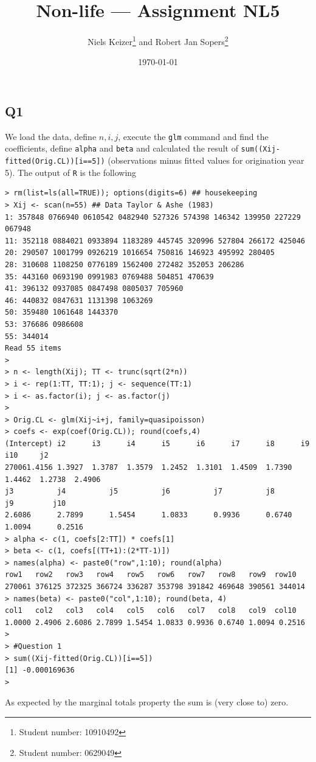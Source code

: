 \documentclass[11pt]{article}
\title{Non-life --- Assignment NL5}  %
\author{
  Niels Keizer\footnote{Student number: 10910492}
  \quad and \quad
  Robert Jan Sopers\footnote{Student number: 0629049}
}
\date{\today}
\begin{document}
\maketitle

\subsection*{Q1}

We load the data, define $n,i,j$, execute the \verb|glm| command and find the coefficients, define \verb|alpha| and \verb|beta| and calculated the result of \verb|sum((Xij-fitted(Orig.CL))[i==5])| (observations minus fitted values for origination year 5). The output of \verb|R| is the following

\begin{verbatim}
> rm(list=ls(all=TRUE)); options(digits=6) ## housekeeping
> Xij <- scan(n=55) ## Data Taylor & Ashe (1983)
1: 357848 0766940 0610542 0482940 527326 574398 146342 139950 227229 067948
11: 352118 0884021 0933894 1183289 445745 320996 527804 266172 425046
20: 290507 1001799 0926219 1016654 750816 146923 495992 280405
28: 310608 1108250 0776189 1562400 272482 352053 206286
35: 443160 0693190 0991983 0769488 504851 470639
41: 396132 0937085 0847498 0805037 705960
46: 440832 0847631 1131398 1063269
50: 359480 1061648 1443370
53: 376686 0986608
55: 344014
Read 55 items
> 
> n <- length(Xij); TT <- trunc(sqrt(2*n))
> i <- rep(1:TT, TT:1); j <- sequence(TT:1)
> i <- as.factor(i); j <- as.factor(j)
> 
> Orig.CL <- glm(Xij~i+j, family=quasipoisson)
> coefs <- exp(coef(Orig.CL)); round(coefs,4)
(Intercept)	i2      i3      i4      i5      i6      i7      i8      i9      i10     j2 
270061.4156 1.3927  1.3787  1.3579  1.2452  1.3101  1.4509  1.7390  1.4462  1.2738  2.4906 
j3          j4          j5          j6          j7          j8          j9         j10 
2.6086      2.7899      1.5454      1.0833      0.9936      0.6740      1.0094      0.2516 
> alpha <- c(1, coefs[2:TT]) * coefs[1]
> beta <- c(1, coefs[(TT+1):(2*TT-1)])
> names(alpha) <- paste0("row",1:10); round(alpha)
row1   row2   row3   row4   row5   row6   row7   row8   row9  row10 
270061 376125 372325 366724 336287 353798 391842 469648 390561 344014 
> names(beta) <- paste0("col",1:10); round(beta, 4)
col1   col2   col3   col4   col5   col6   col7   col8   col9  col10 
1.0000 2.4906 2.6086 2.7899 1.5454 1.0833 0.9936 0.6740 1.0094 0.2516 
> 
> #Question 1
> sum((Xij-fitted(Orig.CL))[i==5])
[1] -0.000169636
> 
\end{verbatim}
As expected by the marginal totals property the sum is (very close to) zero.
\end{document}
